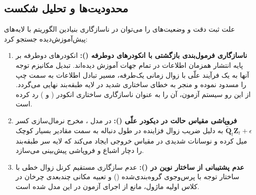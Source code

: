 \subsection{محدودیت‌ها و تحلیل شکست}
علت ثبت دقت  و وضعیت‌های  را می‌توان در ناسازگاری بنیادین الگوریتم با لایه‌های پیش‌آموزش‌دیده جستجو کرد:
\begin{enumerate}
    \item \textbf{ناسازگاری فرمول‌بندی بازگشتی با انکودرهای دوطرفه ():} انکودرهای دوطرفه بر پایه انتشار همزمان اطلاعات در تمام جهات آموزش دیده‌اند. تبدیل مکانیزم توجه آنها به یک فرآیند علّی با زوال زمانی یک‌طرفه، مسیر تبادل اطلاعات به سمت چپ را مسدود نموده و منجر به خطای ساختاری شدید در لایه طبقه‌بند نهایی می‌گردد. از این رو سیستم آزمون، آن را به عنوان ناسازگاری ساختاری انکودر ( و ) رد کرده است.
    \item \textbf{فروپاشی مقیاس حالت در دیکودر علّی ():} در مدل ، مخرج نرمال‌سازی کسر $\tilde{\mathbf{Q}}_t \mathbf{Z}_t + \epsilon$ به دلیل ضریب زوال فزاینده در طول دنباله به سمت مقادیر بسیار کوچک میل کرده و نوسانات شدیدی در مقیاس خروجی ایجاد می‌کند که لایه سر طبقه‌بند را دچار اشباع و فروپاشی پیش‌بینی می‌سازد.
    \item \textbf{عدم پشتیبانی از ساختار نوین در  ():} عدم سازگاری مستقیم کرنل زوال خطی با ساختار توجه با پرس‌وجوی گروه‌بندی‌شده () و تعبیه مکانی چندبعدی چرخان در کلاس اولیه ماژول، مانع از اجرای آزمون در این مدل شده است.
\end{enumerate}
